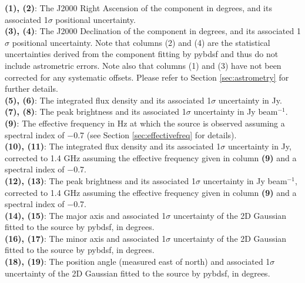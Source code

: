 \documentclass[usenatbib,usedcolumn]{mnras}
\begin{document}
\noindent
{\bf (1), (2)}: The J2000 Right Ascension of the component in degrees, and its associated 1$\sigma$ positional uncertainty.
\\

\noindent
{\bf (3), (4)}: The J2000 Declination of the component in degrees, and its associated 1$\sigma$ positional uncertainty. Note that columns (2) and (4) are the statistical uncertainties derived from the component fitting by {\sc pybdsf} and thus do not include astrometric errors. Note also that columns (1) and (3) have not been corrected for any systematic offsets. Please refer to Section \ref{sec:astrometry} for further details.
\\

\noindent
{\bf (5), (6)}: The integrated flux density and its associated 1$\sigma$ uncertainty in Jy.
\\

\noindent
{\bf (7), (8)}: The peak brightness and its associated 1$\sigma$ uncertainty in Jy beam$^{-1}$.
\\

\noindent
{\bf (9)}: The effective frequency in Hz at which the source is observed assuming a spectral index of $-$0.7 (see Section \ref{sec:effectivefreq} for details).
\\

\noindent
{\bf (10), (11)}: The integrated flux density and its associated 1$\sigma$ uncertainty in Jy, corrected to 1.4 GHz assuming the effective frequency given in column {\bf (9)} and a spectral index of $-$0.7.
\\

\noindent
{\bf (12), (13)}: The peak brightness and its associated 1$\sigma$ uncertainty in Jy beam$^{-1}$, corrected to 1.4 GHz assuming the effective frequency given in column {\bf (9)} and a spectral index of $-$0.7.
\\

\noindent
{\bf (14), (15)}: The major axis and associated 1$\sigma$ uncertainty of the 2D Gaussian fitted to the source by {\sc pybdsf}, in degrees.
\\

\noindent
{\bf (16), (17)}: The minor axis and associated 1$\sigma$ uncertainty of the 2D Gaussian fitted to the source by {\sc pybdsf}, in degrees.
\\

\noindent
{\bf (18), (19)}: The position angle (measured east of north) and associated 1$\sigma$ uncertainty of the 2D Gaussian fitted to the source by {\sc pybdsf}, in degrees.
\\
\end{document}
